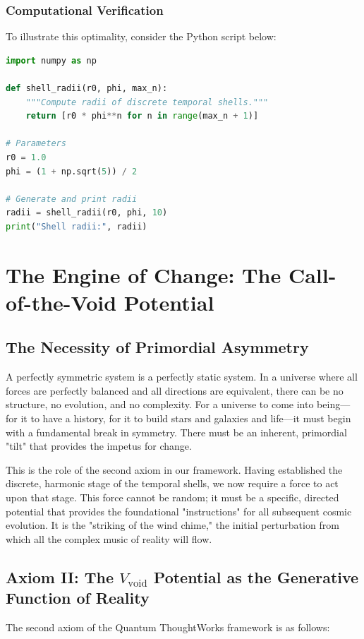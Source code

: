 \documentclass[12pt]{report}
\begin{document}
\subsection{Computational Verification}
To illustrate this optimality, consider the Python script below:
\begin{lstlisting}[language=Python]
import numpy as np

def shell_radii(r0, phi, max_n):
    """Compute radii of discrete temporal shells."""
    return [r0 * phi**n for n in range(max_n + 1)]

# Parameters
r0 = 1.0
phi = (1 + np.sqrt(5)) / 2

# Generate and print radii
radii = shell_radii(r0, phi, 10)
print("Shell radii:", radii)
\end{lstlisting}

\chapter{The Engine of Change: The Call-of-the-Void Potential}

\section{The Necessity of Primordial Asymmetry}
A perfectly symmetric system is a perfectly static system. In a universe where all forces are perfectly balanced and all directions are equivalent, there can be no structure, no evolution, and no complexity. For a universe to come into being—for it to have a history, for it to build stars and galaxies and life—it must begin with a fundamental break in symmetry. There must be an inherent, primordial "tilt" that provides the impetus for change.

This is the role of the second axiom in our framework. Having established the discrete, harmonic stage of the temporal shells, we now require a force to act upon that stage. This force cannot be random; it must be a specific, directed potential that provides the foundational "instructions" for all subsequent cosmic evolution. It is the "striking of the wind chime," the initial perturbation from which all the complex music of reality will flow.

\section{Axiom II: The \texorpdfstring{$V_{\text{void}}$}{V_void} Potential as the Generative Function of Reality}
The second axiom of the Quantum ThoughtWorks framework is as follows:
\end{document}

